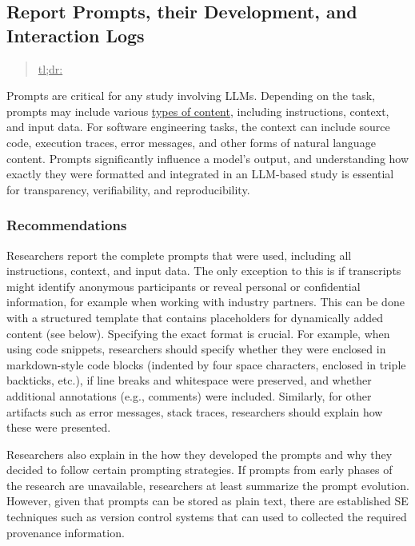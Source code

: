



\subsection{Report Prompts, their Development, and Interaction Logs}
\label{sec:report-prompts-their-development-and-interaction-logs}

\begin{quote}
\underline{tl;dr:} 
\end{quote}

Prompts are critical for any study involving LLMs.
Depending on the task, prompts may include various \href{https://www.promptingguide.ai/introduction/elements}{types of content}, including instructions, context, and input data.
For software engineering tasks, the context can include source code, execution traces, error messages, and other forms of natural language content.
Prompts significantly influence a model's output, and understanding how exactly they were formatted and integrated in an LLM-based study is essential for transparency, verifiability, and reproducibility.

\subsubsection{Recommendations}

Researchers \must report the complete prompts that were used, including all instructions, context, and input data.
The only exception to this is if transcripts might identify anonymous participants or reveal personal or confidential information, for example when working with industry partners.
This can be done with a structured template that contains placeholders for dynamically added content (see below).
Specifying the exact format is crucial.
For example, when using code snippets, researchers should specify whether they were enclosed in markdown-style code blocks (indented by four space characters, enclosed in triple backticks, etc.), if line breaks and whitespace were preserved, and whether additional annotations (e.g., comments) were included.
Similarly, for other artifacts such as error messages, stack traces, researchers should explain how these were presented.

Researchers \must also explain in the \paper how they developed the prompts and why they decided to follow certain prompting strategies.
If prompts from early phases of the research are unavailable, researchers \must at least summarize the prompt evolution.
However, given that prompts can be stored as plain text, there are established SE techniques such as version control systems that can used to collected the required provenance information.

